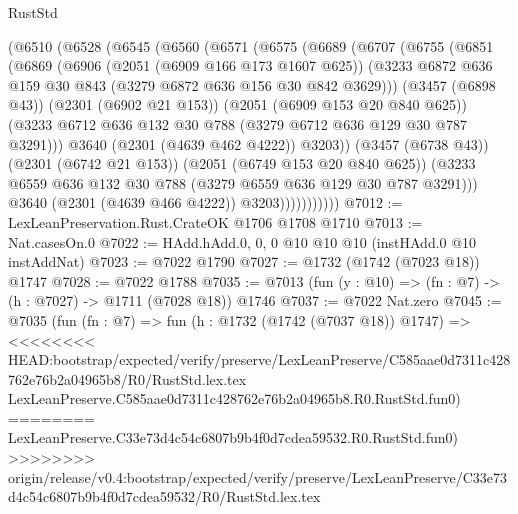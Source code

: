 \begin{lexlean}{RustStd}
\begin{coremodule}
{\begin{coremodule}
{{{{{{{{{{{{{            (@6510
              (@6528
                (@6545
                  (@6560
                    (@6571
                      (@6575
                        (@6689
                          (@6707
                            (@6755
                              (@6851
                                (@6869
                                  (@6906
                                    (@2051 (@6909 @166 @173 @1607 @625))
                                    (@3233
                                      @6872
                                      @636
                                      @159
                                      @30
                                      @843
                                      (@3279 @6872 @636 @156 @30 @842 @3629)))
                                  (@3457 (@6898 @43))
                                  (@2301 (@6902 @21 @153))
                                  (@2051 (@6909 @153 @20 @840 @625))
                                  (@3233
                                    @6712
                                    @636
                                    @132
                                    @30
                                    @788
                                    (@3279 @6712 @636 @129 @30 @787 @3291)))
                                @3640
                                (@2301 (@4639 @462 @4222))
                                @3203))
                            (@3457 (@6738 @43))
                            (@2301 (@6742 @21 @153))
                            (@2051 (@6749 @153 @20 @840 @625))
                            (@3233 @6559 @636 @132 @30 @788 (@3279 @6559 @636 @129 @30 @787 @3291)))
                          @3640
                          (@2301 (@4639 @466 @4222))
                          @3203)))))))))))
@7012 := LexLeanPreservation.Rust.CrateOK @1706 @1708 @1710
@7013 := Nat.casesOn.{0}
@7022 := HAdd.hAdd.{0, 0, 0} @10 @10 @10 (instHAdd.{0} @10 instAddNat)
@7023 := @7022 @1790
@7027 := @1732 (@1742 (@7023 @18)) @1747
@7028 := @7022 @1788
@7035 := @7013 (fun (y : @10) => (fn : @7) -> (h : @7027) -> @1711 (@7028 @18)) @1746
@7037 := @7022 Nat.zero
@7045 := @7035
    (fun (fn : @7) =>
    fun (h : @1732 (@1742 (@7037 @18)) @1747) =>
<<<<<<<< HEAD:bootstrap/expected/verify/preserve/LexLeanPreserve/C585aae0d7311c428762e76b2a04965b8/R0/RustStd.lex.tex
    LexLeanPreserve.C585aae0d7311c428762e76b2a04965b8.R0.RustStd.fun0)
========
    LexLeanPreserve.C33e73d4c54c6807b9b4f0d7cdea59532.R0.RustStd.fun0)
>>>>>>>> origin/release/v0.4:bootstrap/expected/verify/preserve/LexLeanPreserve/C33e73d4c54c6807b9b4f0d7cdea59532/R0/RustStd.lex.tex
}}}}}}}}}}}}}
\end{coremodule}}
\end{coremodule}
\end{lexlean}
